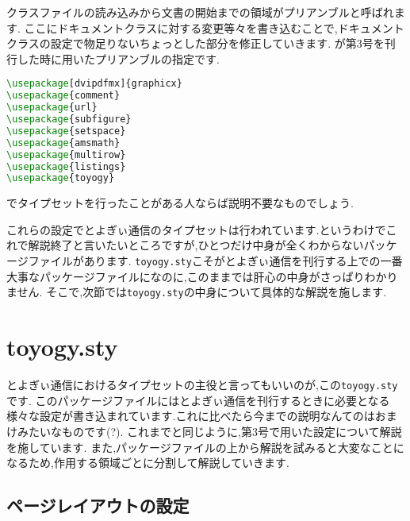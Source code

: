 クラスファイルの読み込みから文書の開始までの領域がプリアンブルと呼ばれます.
ここにドキュメントクラスに対する変更等々を書き込むことで,ドキュメントクラスの設定で物足りないちょっとした部分を修正していきます.
が第3号を刊行した時に用いたプリアンブルの指定です.
\begin{lstlisting}[caption=プリアンブル,label=lis:preamble,language=tex]
\usepackage[dvipdfmx]{graphicx}
\usepackage{comment}
\usepackage{url}
\usepackage{subfigure}
\usepackage{setspace}
\usepackage{amsmath}
\usepackage{multirow}
\usepackage{listings}
\usepackage{toyogy}
\end{lstlisting}
{\LaTeXe}でタイプセットを行ったことがある人ならば説明不要なものでしょう.

これらの設定でとよぎぃ通信のタイプセットは行われています.というわけでこれで解説終了と言いたいところですが,ひとつだけ中身が全くわからないパッケージファイルがあります.
\texttt{toyogy.sty}こそがとよぎぃ通信を刊行する上での一番大事なパッケージファイルになのに,このままでは肝心の中身がさっぱりわかりません.
そこで,次節では\texttt{toyogy.sty}の中身について具体的な解説を施します.
\section{toyogy.sty}

とよぎぃ通信におけるタイプセットの主役と言ってもいいのが,この\texttt{toyogy.sty}です.
このパッケージファイルにはとよぎぃ通信を刊行するときに必要となる様々な設定が書き込まれています.これに比べたら今までの説明なんてのはおまけみたいなものです(?).
これまでと同じように,第3号で用いた設定について解説を施しています.
また,パッケージファイルの上から解説を試みると大変なことになるため,作用する領域ごとに分割して解説していきます.

\subsection{ページレイアウトの設定}

